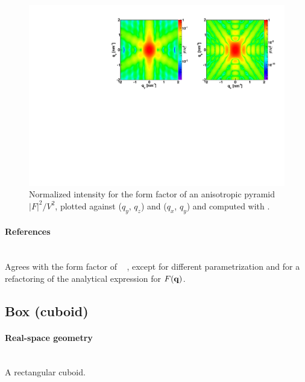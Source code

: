 \begin{figure}[h]
\begin{center}
\includegraphics[angle=-90,width=\textwidth]{fig/ff/figffanisopyramid.pdf}
\end{center}
\caption{Normalized intensity for the form factor of an anisotropic
  pyramid $|F|^2/V^2$, plotted against ($q_y$, $q_z$) and  ($q_x$, $q_y$) and computed with .}
\label{fig:FFAnisoPyramidEx}
\end{figure}

\paragraph{References}\strut\\
Agrees with the  form factor of \IsGISAXS\
\cite[Eq.~2.40]{Laz08} \cite[Eq.~217]{ReLL09},
except for different parametrization and
for a refactoring of the analytical expression for $F(\mathbf{q})$.

\FloatBarrier\newpage
\subsection{Box (cuboid)} \label{sec:Box}

\paragraph{Real-space geometry}\strut\\
A rectangular cuboid.

